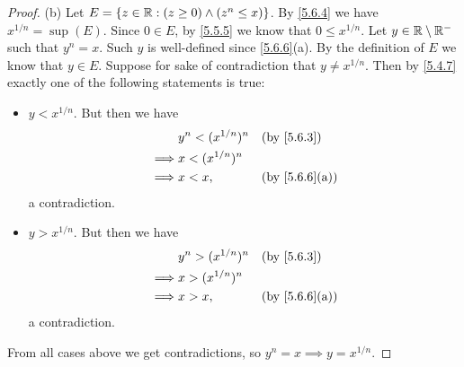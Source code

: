 \begin{proof}{(b)}
  Let \(E = \{z \in \mathbb{R} : (z \geq 0) \land (z^n \leq x)\}\).
  By \cref{5.6.4} we have \(x^{1 / n} = \sup(E)\).
  Since \(0 \in E\), by \cref{5.5.5} we know that \(0 \leq x^{1 / n}\).
  Let \(y \in \mathbb{R} \setminus \mathbb{R}^-\) such that \(y^n = x\).
  Such \(y\) is well-defined since \cref{5.6.6}(a).
  By the definition of \(E\) we know that \(y \in E\).
  Suppose for sake of contradiction that \(y \neq x^{1 / n}\).
  Then by \cref{5.4.7} exactly one of the following statements is true:
  \begin{itemize}
    \item \(y < x^{1 / n}\).
          But then we have
          \begin{align*}
                     & y^n < (x^{1 / n})^n &  & \by{5.6.3}                  \\
            \implies & x < (x^{1 / n})^n                                    \\
            \implies & x < x,              &  & \text{(by \cref{5.6.6}(a))}
          \end{align*}
          a contradiction.
    \item \(y > x^{1 / n}\).
          But then we have
          \begin{align*}
                     & y^n > (x^{1 / n})^n &  & \by{5.6.3}                  \\
            \implies & x > (x^{1 / n})^n                                    \\
            \implies & x > x,              &  & \text{(by \cref{5.6.6}(a))}
          \end{align*}
          a contradiction.
  \end{itemize}
  From all cases above we get contradictions, so \(y^n = x \implies y = x^{1 / n}\).
\end{proof}

